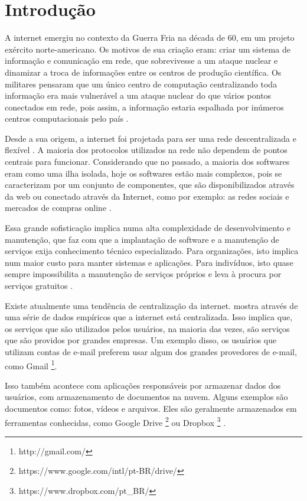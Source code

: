 \chapter{Introdução}
\label{cap-introducao}

A internet emergiu no contexto da Guerra Fria na década
de 60, em um projeto exército norte-americano. Os motivos de sua criação eram:
criar um sistema de informação e comunicação em rede, que
sobrevivesse a um ataque nuclear e dinamizar a troca de informações entre os centros de
produção científica. Os militares pensaram que um único centro de computação
centralizando toda informação era mais vulnerável a um ataque nuclear do que vários
pontos conectados em rede, pois assim, a informação estaria espalhada por inúmeros
centros computacionais pelo país \cite{giles2010psychology}.

Desde a sua origem, a internet foi projetada para ser uma rede
descentralizada e flexível \cite{galaxia}. A maioria dos protocolos
utilizados na rede não dependem de pontos centrais para funcionar. 
Considerando que no
passado, a maioria dos softwares eram como uma ilha isolada, hoje os softwares 
estão mais complexos, pois se caracterizam por um conjunto de componentes, que 
são disponibilizados através da web ou conectado através da Internet,
como por exemplo: as redes sociais e mercados de compras online \cite{byhand}.

Essa grande sofisticação implica numa alta complexidade de
desenvolvimento e manutenção, que faz com que a
implantação de software e a manutenção de serviços exija conhecimento técnico
especializado. Para organizações, isto implica num maior
custo para manter sistemas e aplicações. Para indivíduos, isto quase sempre
impossibilita a manutenção de serviços próprios e leva à procura por serviços
gratuitos \cite{shak2015}.

Existe atualmente uma tendência de centralização da internet. 
mostra
através de uma série de dados empíricos que a internet está centralizada. Isso
implica que, os serviços que são utilizados pelos usuários, na maioria
das vezes, são serviços que são providos por grandes empresas. 
Um exemplo disso, os usuários que utilizam contas de e-mail preferem usar algum
dos grandes provedores de e-mail, como Gmail \footnote{http://gmail.com/}. 

Isso também acontece com aplicações responsáveis por armazenar dados dos usuários,
com armazenamento de documentos na nuvem. Alguns exemplos são 
documentos como: fotos, vídeos e arquivos. Eles são geralmente armazenados em 
ferramentas conhecidas, como Google Drive 
\footnote{https://www.google.com/intl/pt-BR/drive/} ou Dropbox \footnote{https://www.dropbox.com/pt\_BR/}
. 

